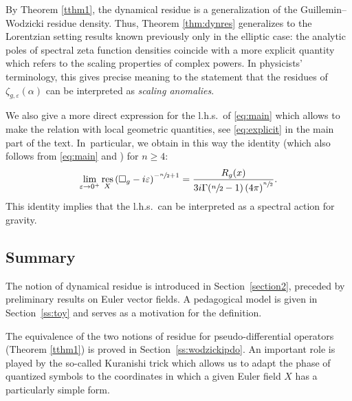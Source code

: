 \documentclass[JEP,XML,SOM,Unicode]{cedram}
\theoremstyle{definition}
\let\cv\alpha
\let\euler X
\DeclareMathOperator{\resnorm}{res}
\newcommand{\resdyn}{{\resnorm_\euler}}
\renewcommand{\sec}[1]{Section~\ref{#1}}
\begin{document}
By Theorem \ref{tthm1}, the dynamical residue is a generalization of the Guillemin--Wodzicki residue density. Thus, Theorem \ref{thm:dynres} generalizes to the Lorentzian setting results known previously only in the elliptic case: the analytic poles of spectral zeta function densities coincide with a more explicit quantity which refers to the scaling properties of complex powers. In physicists' terminology, this gives precise meaning to the statement that the residues of $\zeta_{g,\varepsilon}(\cv)$ can be interpreted as \emph{scaling anomalies}.

We also give a more direct expression for the l.h.s.~of \eqref{eq:main} which allows to make the relation with local geometric quantities, see \eqref{eq:explicit} in the main part of the text. In~particular, we obtain in this way the identity (which also follows from \eqref{eq:main} and \cite[Th.\,1.1]{Dang2020}) for $n\geqslant 4$:
\begin{equation}\label{eq:main2}
\lim_{\varepsilon\to 0^+}\resdyn \left(\square_g-i \varepsilon \right)^{-\sfrac{n}{2}+1} = \frac{R_g(x)}{3i\Gamma(\sfrac{n}{2}-1)\left(4\pi\right)^{\sfrac{n}{2}}}.
\end{equation}
This identity implies that the l.h.s.~can be interpreted as a spectral action for gravity.

\subsection{Summary} The notion of dynamical residue is introduced in \sec{section2}, preceded by preliminary results on Euler vector fields. A pedagogical model is given in \sec{ss:toy} and serves as a motivation for the definition.

The equivalence of the two notions of residue for pseudo-differential operators (Theorem \ref{tthm1}) is proved in \sec{ss:wodzickipdo}. An important role is played by the so-called Kuranishi trick which allows us to adapt the phase of quantized symbols to the coordinates in which a given Euler field $X$ has a particularly simple form.
\end{document}
